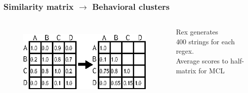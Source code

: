 \begin{frame}
\frametitle{Similarity matrix $\rightarrow$ Behavioral clusters}

\begin{columns}[t] %
\begin{figure}[h]
  \centering
  \includegraphics[scale=1]{nontex/illustrations/matrixToGraph.eps}
  \label{fig:matrixToGraph}
\end{figure}
\begin{center}
Rex  generates \\
400 strings for each regex.\\
Average scores to half-matrix for MCL\\
\end{center}
\end{columns}
\end{frame}










